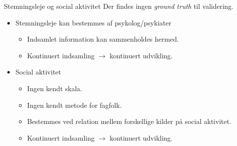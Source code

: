 \begin{frame}{Stemningsleje og social aktivitet}
Der findes ingen \textit{ground truth} til validering.
\begin{itemize}
\item Stemningsleje kan bestemmes af psykolog/psykiater
\begin{itemize}
\item Indsamlet information kan sammenholdes hermed.
\item Kontinuert indsamling $\rightarrow$ kontinuert udvikling.
\end{itemize}\pause
\item Social aktivitet
\begin{itemize}
\item Ingen kendt skala.
\item Ingen kendt metode for fagfolk.
\item Bestemmes ved relation mellem forskellige kilder på social aktivitet.
\item Kontinuert indsamling $\rightarrow$ kontinuert udvikling.
\end{itemize}
\end{itemize}
\end{frame}

